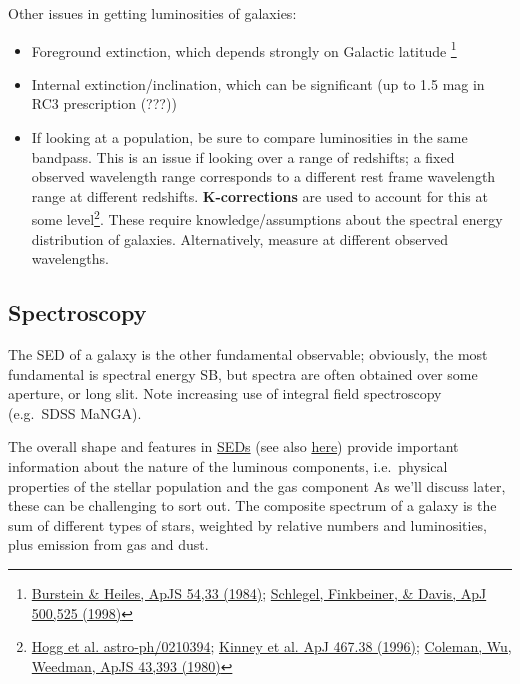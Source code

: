 \documentclass{article}
\newcommand{\mynotes}[1]{\textcolor{cadmiumgreen}{#1}}
\begin{document}
Other issues in getting luminosities of galaxies:
\begin{itemize}
    \item Foreground extinction, which depends strongly on Galactic
        latitude
        \footnote{\href{http://adsabs.harvard.edu/cgi-bin/nph-bib_query?bibcode=1984ApJS...54...33B}
            {Burstein \& Heiles, ApJS 54,33 (1984)};
            \href{http://adsabs.harvard.edu/cgi-bin/nph-bib_query?bibcode=1998ApJ...500..525S}
        {Schlegel, Finkbeiner, \& Davis, ApJ 500,525 (1998)}}
    \item Internal extinction/inclination, which can be significant
        (up to 1.5 mag in RC3 prescription \mynotes{(???)})
    \item If looking at a population, be sure to compare luminosities in
        the same bandpass. This is an issue if looking over a range of
        redshifts; a fixed observed wavelength range corresponds to a
        different rest frame wavelength range at different redshifts.
        \textbf{K-corrections} are used to account for this at some
        level\footnote{\href{http://arxiv.org/abs/astro-ph/0210394}
            {Hogg et al. astro-ph/0210394};
            \href{http://adsabs.harvard.edu/cgi-bin/nph-bib_query?bibcode=1996ApJ...467...38K}
            {Kinney et al. ApJ 467.38 (1996)};
            \href{http://adsabs.harvard.edu/cgi-bin/nph-bib_query?bibcode=1980ApJS...43..393C}
            {Coleman, Wu, Weedman, ApJS 43,393 (1980)}}.
        These require knowledge/assumptions about the spectral energy
        distribution of galaxies. Alternatively, measure at different
        observed wavelengths.
\end{itemize}

\subsection{Spectroscopy}
The SED of a galaxy is the other fundamental observable; obviously,
the most fundamental is spectral energy SB, but spectra are often
obtained over some aperture, or long slit. Note
increasing use of integral field spectroscopy (e.g.\ SDSS MaNGA).

The overall shape and features in \href{http://astronomy.nmsu.edu/holtz/a555/resources/galaxyspectra.gif}
{SEDs} (see also \href{http://astronomy.nmsu.edu/nicole/teaching/ASTR505/lectures/quickview.html}
{here}) provide important information
about the nature of the luminous components, i.e.\ physical properties
of the stellar population and the gas component
As we'll discuss later, these can be challenging to sort out.
The composite spectrum of a galaxy is the sum of different types of
stars, weighted by relative numbers and luminosities, plus emission
from gas and dust.
\end{document}
